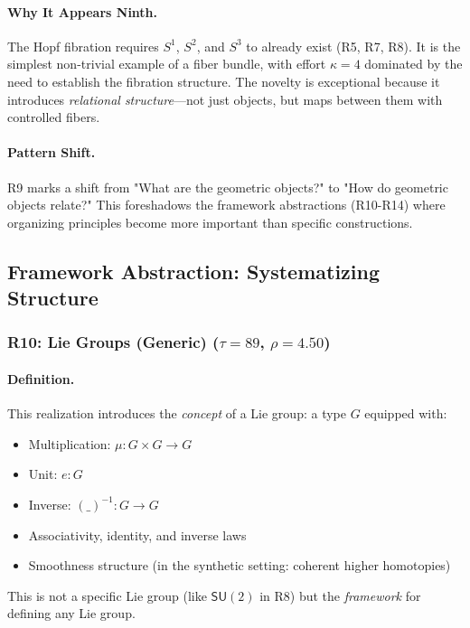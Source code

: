 \documentclass[11pt]{article}
\theoremstyle{definition}
\begin{document}
\paragraph{Why It Appears Ninth.}
The Hopf fibration requires $S^1$, $S^2$, and $S^3$ to already exist (R5, R7, R8). It is the simplest non-trivial example of a fiber bundle, with effort $\kappa=4$ dominated by the need to establish the fibration structure. The novelty is exceptional because it introduces \emph{relational structure}—not just objects, but maps between them with controlled fibers.

\paragraph{Pattern Shift.}
R9 marks a shift from "What are the geometric objects?" to "How do geometric objects relate?" This foreshadows the framework abstractions (R10-R14) where organizing principles become more important than specific constructions.

\subsection{Framework Abstraction: Systematizing Structure}

\subsubsection{R10: Lie Groups (Generic) ($\tau=89$, $\rho=4.50$)}

\paragraph{Definition.}
This realization introduces the \emph{concept} of a Lie group: a type $G$ equipped with:
\begin{itemize}
\item Multiplication: $\mu : G \times G \to G$
\item Unit: $e : G$  
\item Inverse: $(\_)^{-1} : G \to G$
\item Associativity, identity, and inverse laws
\item Smoothness structure (in the synthetic setting: coherent higher homotopies)
\end{itemize}

This is not a specific Lie group (like $\mathsf{SU}(2)$ in R8) but the \emph{framework} for defining any Lie group.
\end{document}
